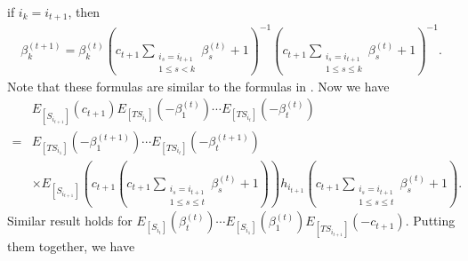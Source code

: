 \documentclass[12pt]{amsart}
\begin{document}
 if $i_k=i_{t+1}$, then 
\begin{align}\label{inductive2}
    \beta_k^{(t+1)}=\beta_k^{(t)}(c_{t+1}\sum_{\substack{i_s=i_{t+1}\\1\leq s<k}} \beta_s^{(t)}+1)^{-1} (c_{t+1}\sum_{\substack{i_s=i_{t+1}\\1\leq s\leq k}} \beta_s^{(t)}+1)^{-1}.
\end{align}
Note that these formulas are similar to the formulas in \cite[Definition 3.6]{notes3}.
Now we have 
\begin{align*}
    &E_{[S_{i_{t+1}}]}(c_{t+1})E_{[TS_{i_1}]}(-\beta_1^{(t)})\cdots E_{[TS_{i_t}]}(-\beta_t^{(t)})\\
    =& E_{[TS_{i_1}]}(-\beta_1^{(t+1)})\cdots E_{[TS_{i_t}]}(-\beta_t^{(t+1)}) \\
    &\times  E_{[S_{i_{t+1}}]}(c_{t+1}(c_{t+1}\sum_{\substack{i_s=i_{t+1}\\1\leq s\leq t}} \beta_s^{(t)}+1)) h_{i_{t+1}}(c_{t+1}\sum_{\substack{i_s=i_{t+1}\\1\leq s\leq t}} \beta_s^{(t)}+1).
\end{align*}
Similar result holds for $ E_{[S_{i_t}]}(\beta_t^{(t)})\cdots E_{[S_{i_1}]}(\beta_1^{(t)}) E_{[TS_{i_{t+1}}]}(-c_{t+1})$.
Putting them together, we have 
\end{document}
